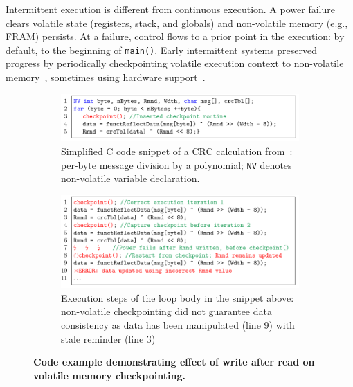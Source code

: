 Intermittent execution is different from continuous execution. A power failure clears volatile  state (registers, stack, and globals) and non-volatile memory (e.g., FRAM) persists. At a failure, control flows to a prior point in the execution: by default, to the beginning of {\tt main()}. Early intermittent systems preserved progress by periodically checkpointing volatile execution context to non-volatile memory~\cite{mementos,quickrecall}, sometimes using hardware support~\cite{mementos,mottola2017harvos,hibernusplusplus,hibernus,idetic}. 

\begin{figure}
	\begin{subfigure}[t]{\linewidth}
		\centering \includegraphics[width=\columnwidth]{figures/crc_example}
		\caption{Simplified C code snippet of a CRC calculation from~\cite{hicks_mibench2_2016}: per-byte message division by a polynomial; \texttt{NV} denotes non-volatile variable declaration.}\label{fig:crc_example}
	\end{subfigure}
	\begin{subfigure}[t]{\linewidth}
		\centering \includegraphics[width=\columnwidth]{figures/crc_example_war}
		\caption{Execution steps of the loop body in the snippet above: non-volatile checkpointing did not guarantee data consistency as data has been manipulated (line 9) with stale reminder (line 3)}\label{fig:crc_example_war}
    \end{subfigure}
	\caption{\textbf{Code example demonstrating effect of write after read on volatile memory checkpointing.}}\label{fig:code_demo_incosistency}
\end{figure}

